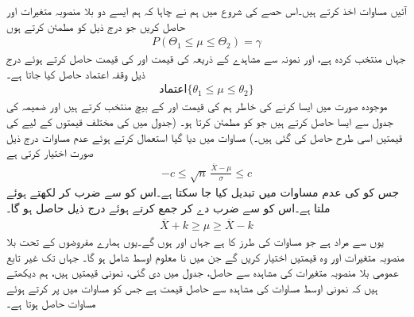 آئیں مساوات  اخذ کرتے ہیں۔اس حصے کی شروع میں ہم نے چاہا کہ ہم ایسے دو بلا منصوبہ متغیرات  اور  حاصل کریں جو درج ذیل کو مطمئن کرتے ہوں
\begin{align}\label{مساوات-شماریات_غیر_تابع_متغیرات_اوسط_تغیریت_پ}
P(\Theta_1\le \mu\le \Theta_2)=\gamma
\end{align}
جہاں  منتخب کردہ ہے، اور نمونہ سے مشاہدے کے ذریعہ  کی قیمت  اور  کی قیمت  حاصل کرتے ہوئے درج ذیل  وقفہ اعتماد  حاصل کیا جاتا ہے۔
\begin{align*}
\text{اعتماد}\{\theta_1\le \mu\le\theta_2\}
\end{align*}
موجودہ صورت میں ایسا کرنے کی خاطر ہم  کی قیمت  اور  کے بیچ منتخب کرتے ہیں اور  ضمیمہ  کی جدول  سے ایسا  حاصل کرتے ہیں جو  کو مطمئن کرتا ہو۔ (جدول  میں  کی مختلف قیمتوں کے لیے  کی قیمتیں اسی طرح حاصل کی گئی ہیں۔) مساوات  میں دیا گیا  استعمال کرتے ہوئے عدم مساوات  درج ذیل صورت اختیار کرتی ہے
\begin{align*}
-c\le \sqrt{n}\,\frac{\overline{X}-\mu}{\sigma}\le c
\end{align*}
جس کو  کی عدم مساوات میں تبدیل کیا جا سکتا ہے۔اس کو  سے ضرب کر   لکھتے ہوئے   ملتا ہے۔اس کو  سے ضرب دے کر  جمع کرتے ہوئے درج ذیل حاصل ہو گا۔
\begin{align}\label{مساوات-شماریات_غیر_تابع_متغیرات_اوسط_تغیریت_ت}
\overline{X}+k\ge \mu\ge \overline{X}-k
\end{align}
یوں  سے مراد  ہے جو 
 مساوات  کی طرز کا ہے جہاں  اور  ہوں گے۔یوں ہمارے مفروضوں کے تحت بلا منصوبہ متغیرات  اور  وہ قیمتیں اختیار کریں گے جن میں نا معلوم اوسط  شامل ہو گا۔ جہاں تک  غیر تابع عمومی بلا منصوبہ متغیرات  کی مشاہدہ سے حاصل، جدول  میں دی گئی،  نمونی قیمتیں   ہیں، ہم دیکھتے ہیں کہ نمونی اوسط  مساوات  کی مشاہدہ سے حاصل قیمت ہے جس کو مساوات  میں پر کرتے ہوئے مساوات  حاصل ہوتا ہے۔


